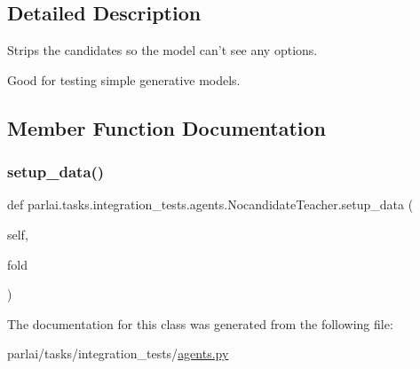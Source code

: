 \subsection{Detailed Description}
\begin{DoxyVerb}Strips the candidates so the model can't see any options.

Good for testing simple generative models.
\end{DoxyVerb}
 

\subsection{Member Function Documentation}
\mbox{\label{classparlai_1_1tasks_1_1integration__tests_1_1agents_1_1NocandidateTeacher_a0cf2accf985db966f44f77a7328fcff2}} 
\subsubsection{\texorpdfstring{setup\+\_\+data()}{setup\_data()}}
{\footnotesize\ttfamily def parlai.\+tasks.\+integration\+\_\+tests.\+agents.\+Nocandidate\+Teacher.\+setup\+\_\+data (\begin{DoxyParamCaption}\item[{}]{self,  }\item[{}]{fold }\end{DoxyParamCaption})}



The documentation for this class was generated from the following file\+:\begin{DoxyCompactItemize}
\item 
parlai/tasks/integration\+\_\+tests/\hyperlink{parlai_2tasks_2integration__tests_2agents_8py}{agents.\+py}\end{DoxyCompactItemize}
